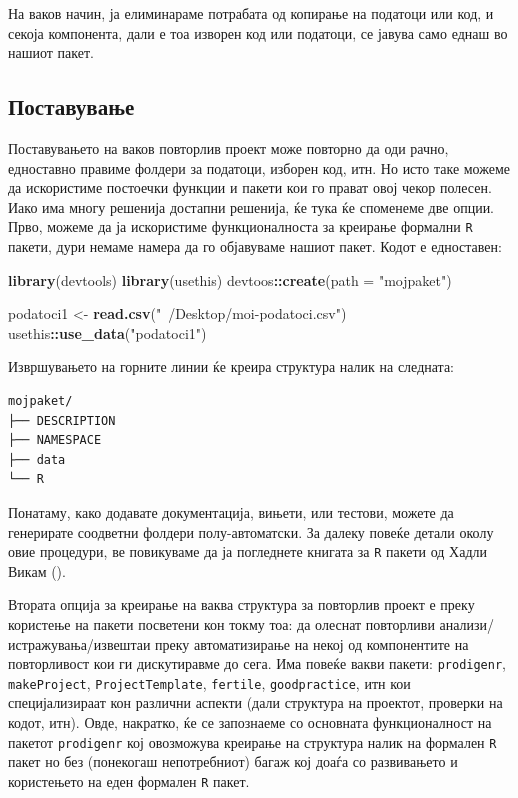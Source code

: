 \documentclass[
]{book}
\newenvironment{Shaded}{\begin{snugshade}}{\end{snugshade}}
\newcommand{\DataTypeTok}[1]{\textcolor[rgb]{0.13,0.29,0.53}{#1}}
\newcommand{\KeywordTok}[1]{\textcolor[rgb]{0.13,0.29,0.53}{\textbf{#1}}}
\newcommand{\NormalTok}[1]{#1}
\newcommand{\OperatorTok}[1]{\textcolor[rgb]{0.81,0.36,0.00}{\textbf{#1}}}
\newcommand{\StringTok}[1]{\textcolor[rgb]{0.31,0.60,0.02}{#1}}
\begin{document}
На ваков начин, ја елиминараме потрабата од копирање на податоци или код, и секоја компонента, дали е тоа изворен код или податоци, се јавува само еднаш во нашиот пакет.

\hypertarget{ux43fux43eux441ux442ux430ux432ux443ux432ux430ux45aux435}{%
\subsection{Поставување}\label{ux43fux43eux441ux442ux430ux432ux443ux432ux430ux45aux435}}

Поставувањето на ваков повторлив проект може повторно да оди рачно, едноставно правиме фолдери за податоци, изборен код, итн. Но исто таке можеме да искористиме постоечки функции и пакети кои го прават овој чекор полесен. Иако има многу решенија достапни решенија, ќе тука ќе споменеме две опции. Прво, можеме да ја искористиме функционалноста за креирање формални \texttt{R} пакети, дури немаме намера да го објавуваме нашиот пакет. Кодот е едноставен:

\begin{Shaded}
\begin{Highlighting}[]
\KeywordTok{library}\NormalTok{(devtools)}
\KeywordTok{library}\NormalTok{(usethis)}
\NormalTok{devtoos}\OperatorTok{::}\KeywordTok{create}\NormalTok{(}\DataTypeTok{path =} \StringTok{"mojpaket"}\NormalTok{)}

\NormalTok{podatoci1 <-}\StringTok{ }\KeywordTok{read.csv}\NormalTok{(}\StringTok{"~/Desktop/moi-podatoci.csv"}\NormalTok{)}
\NormalTok{usethis}\OperatorTok{::}\KeywordTok{use_data}\NormalTok{(}\StringTok{"podatoci1"}\NormalTok{)}
\end{Highlighting}
\end{Shaded}

Извршувањето на горните линии ќе креира структура налик на следната:

\begin{verbatim}
mojpaket/
├── DESCRIPTION
├── NAMESPACE
├── data
└── R
\end{verbatim}

Понатаму, како додавате документација, вињети, или тестови, можете да генерирате соодветни фолдери полу-автоматски. За далеку повеќе детали околу овие процедури, ве повикуваме да ја погледнете книгата за \texttt{R} пакети од Хадли Викам (\citep{wickham2015r}).

Втората опција за креирање на ваква структура за повторлив проект е преку користење на пакети посветени кон токму тоа: да олеснат повторливи анализи/истражувања/извештаи преку автоматизирање на некој од компонентите на повторливост кои ги дискутиравме до сега. Има повеќе вакви пакети: \texttt{prodigenr}, \texttt{makeProject}, \texttt{ProjectTemplate}, \texttt{fertile}, \texttt{goodpractice}, итн кои специјализираат кон различни аспекти (дали структура на проектот, проверки на кодот, итн). Овде, накратко, ќе се запознаеме со основната функционалност на пакетот \texttt{prodigenr} кој овозможува креирање на структура налик на формален \texttt{R} пакет но без (понекогаш непотребниот) багаж кој доаѓа со развивањето и користењето на еден формален \texttt{R} пакет.
\end{document}
